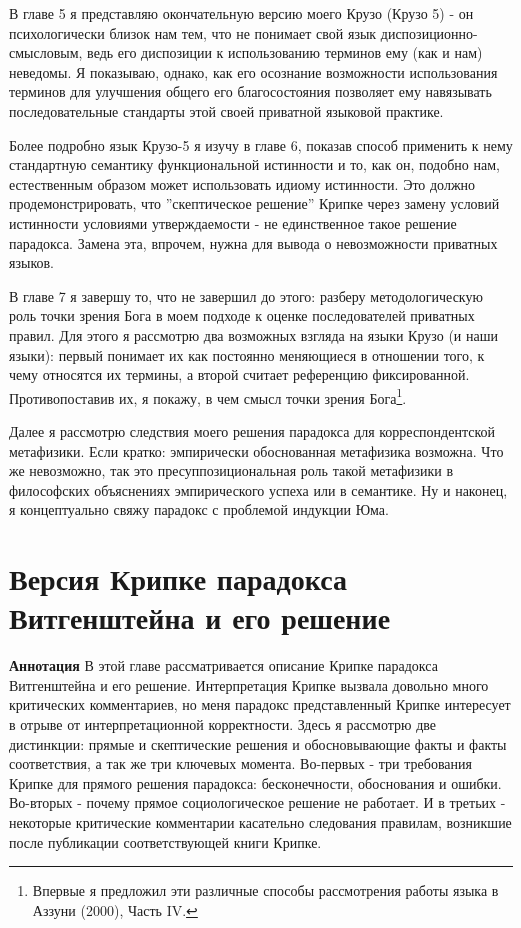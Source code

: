 \documentclass{book}
\begin{document}
В главе 5 я представляю окончательную версию моего Крузо (Крузо 5) - он психологически близок нам тем, что не понимает свой язык диспозиционно-смысловым, ведь его диспозиции к использованию терминов ему (как и нам) неведомы. Я показываю, однако, как его осознание возможности использования терминов для улучшения общего его благосостояния позволяет ему навязывать последовательные стандарты этой своей приватной языковой практике.

Более подробно язык Крузо-5 я изучу в главе 6, показав способ применить к нему стандартную семантику функциональной истинности и то, как он, подобно нам, естественным образом может использовать идиому истинности. Это должно продемонстрировать, что ''скептическое решение'' Крипке через замену условий истинности условиями утверждаемости - не единственное такое решение парадокса. Замена эта, впрочем, нужна для вывода о невозможности приватных языков.

В главе 7 я завершу то, что не завершил до этого: разберу методологическую роль точки зрения Бога в моем подходе к оценке последователей приватных правил. Для этого я рассмотрю два возможных взгляда на языки Крузо (и наши языки): первый понимает их как постоянно меняющиеся в отношении того, к чему относятся их термины, а второй считает референцию фиксированной. Противопоставив их, я покажу, в чем смысл точки зрения Бога\footnote{Впервые я предложил эти различные способы рассмотрения работы языка в Аззуни (2000), Часть IV.}.

Далее я рассмотрю следствия моего решения парадокса для корреспондентской метафизики. Если кратко: эмпирически обоснованная метафизика возможна. Что же невозможно, так это пресуппозициональная роль такой метафизики в философских объяснениях эмпирического успеха или в семантике. Ну и наконец, я концептуально свяжу парадокс с проблемой индукции Юма.

\chapter{Версия Крипке парадокса Витгенштейна и его решение}

\textbf{Аннотация} В этой главе рассматривается описание Крипке парадокса Витгенштейна и его решение. Интерпретация Крипке вызвала довольно много критических комментариев, но меня парадокс представленный Крипке интересует в отрыве от интерпретационной корректности. Здесь я рассмотрю две дистинкции: прямые и скептические решения и обосновывающие факты и факты соответствия, а так же три ключевых момента. Во-первых - три требования Крипке для прямого решения парадокса: бесконечности, обоснования и ошибки. Во-вторых - почему прямое социологическое решение не работает. И в третьих - некоторые критические комментарии касательно следования правилам, возникшие после публикации соответствующей книги Крипке.
\end{document}
